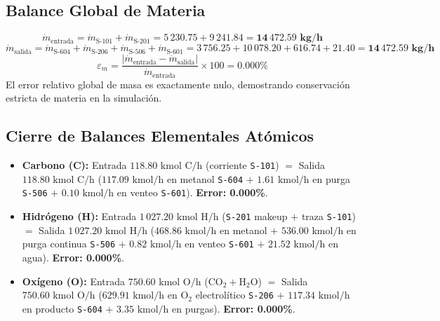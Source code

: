 \documentclass[11pt,letterpaper]{article}
\begin{document}
\subsection*{Balance Global de Materia}
\begin{equation*}
\dot{m}_{\text{entrada}} = \dot{m}_{\text{S-101}} + \dot{m}_{\text{S-201}} = 5\,230.75 + 9\,241.84 = \mathbf{14\,472.59\text{ kg/h}}
\end{equation*}
\begin{equation*}
\dot{m}_{\text{salida}} = \dot{m}_{\text{S-604}} + \dot{m}_{\text{S-206}} + \dot{m}_{\text{S-506}} + \dot{m}_{\text{S-601}} = 3\,756.25 + 10\,078.20 + 616.74 + 21.40 = \mathbf{14\,472.59\text{ kg/h}}
\end{equation*}
\begin{equation*}
\varepsilon_m = \frac{|\dot{m}_{\text{entrada}} - \dot{m}_{\text{salida}}|}{\dot{m}_{\text{entrada}}} \times 100 = \mathbf{0.000\%}
\end{equation*}
El error relativo global de masa es exactamente nulo, demostrando conservación estricta de materia en la simulación.

\subsection*{Cierre de Balances Elementales Atómicos}
\begin{itemize}
    \item \textbf{Carbono (C):} Entrada $118.80\text{ kmol C/h}$ (corriente \texttt{S-101}) $=$ Salida $118.80\text{ kmol C/h}$ ($117.09\text{ kmol/h}$ en metanol \texttt{S-604} $+$ $1.61\text{ kmol/h}$ en purga \texttt{S-506} $+$ $0.10\text{ kmol/h}$ en venteo \texttt{S-601}). \textbf{Error: 0.000\%}.
    \item \textbf{Hidrógeno (H):} Entrada $1\,027.20\text{ kmol H/h}$ (\texttt{S-201} makeup $+$ traza \texttt{S-101}) $=$ Salida $1\,027.20\text{ kmol H/h}$ ($468.86\text{ kmol/h}$ en metanol $+$ $536.00\text{ kmol/h}$ en purga continua \texttt{S-506} $+$ $0.82\text{ kmol/h}$ en venteo \texttt{S-601} $+$ $21.52\text{ kmol/h}$ en agua). \textbf{Error: 0.000\%}.
    \item \textbf{Oxígeno (O):} Entrada $750.60\text{ kmol O/h}$ ($\text{CO}_2 + \text{H}_2\text{O}$) $=$ Salida $750.60\text{ kmol O/h}$ ($629.91\text{ kmol/h}$ en $\text{O}_2$ electrolítico \texttt{S-206} $+$ $117.34\text{ kmol/h}$ en producto \texttt{S-604} $+$ $3.35\text{ kmol/h}$ en purgas). \textbf{Error: 0.000\%}.
\end{itemize}
\end{document}

